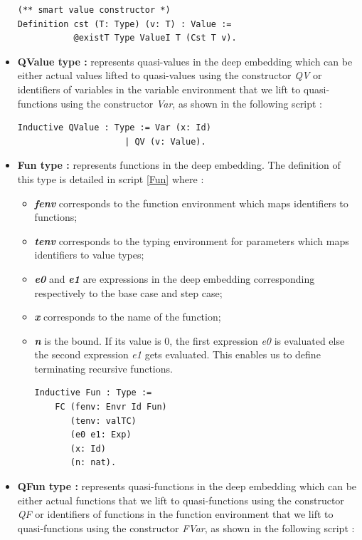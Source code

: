 \begin{itemize}
\begin{lstlisting}[caption = {Values in the deep embedding},xleftmargin=.02\textwidth,xrightmargin=.02\textwidth]
(** smart value constructor *)
Definition cst (T: Type) (v: T) : Value :=
           @existT Type ValueI T (Cst T v).
\end{lstlisting}
	\item \textbf{QValue type :} represents quasi-values in the deep embedding which can be either actual values lifted to quasi-values using the constructor \textit{QV} or identifiers of variables in the variable environment that we lift to quasi-functions using the constructor \textit{Var}, as shown in the following script :
\begin{lstlisting}[caption = {Quasi-values in the deep embedding},xleftmargin=.08\textwidth,
xrightmargin=.1\textwidth]
Inductive QValue : Type := Var (x: Id) 
	                 | QV (v: Value).
\end{lstlisting}
	\item \textbf{Fun type :} represents functions in the deep embedding. The definition of this type is detailed in script \ref{Fun} where :
	\begin{itemize}
		\item \textbf{\textit{fenv}} corresponds to the function environment which maps identifiers to functions;
		\item \textbf{\textit{tenv}} corresponds to the typing environment for parameters which maps identifiers to value types;
		\item \textbf{\textit{e0}} and \textbf{\textit{e1}} are expressions in the deep embedding corresponding respectively to the base case and step case;
		\item \textbf{\textit{x}} corresponds to the name of the function;
		\item \textbf{\textit{n}} is the bound. If its value is 0, the first expression \textit{e0} is evaluated else the second expression \textit{e1} gets evaluated. This enables us to define terminating recursive functions.
\vfill
\begin{lstlisting}[caption = {Functions in the deep embedding},label={Fun},xleftmargin=.08\textwidth,
xrightmargin=.22\textwidth]
Inductive Fun : Type :=
	FC (fenv: Envr Id Fun) 
	   (tenv: valTC)
	   (e0 e1: Exp)
	   (x: Id)
	   (n: nat).
\end{lstlisting}
	\end{itemize}
	\item \textbf{QFun type :} represents quasi-functions in the deep embedding which can be either actual functions that we lift to quasi-functions using the constructor \textit{QF} or identifiers of functions in the function environment that we lift to quasi-functions using the constructor \textit{FVar}, as shown in the following script :

\end{itemize}
